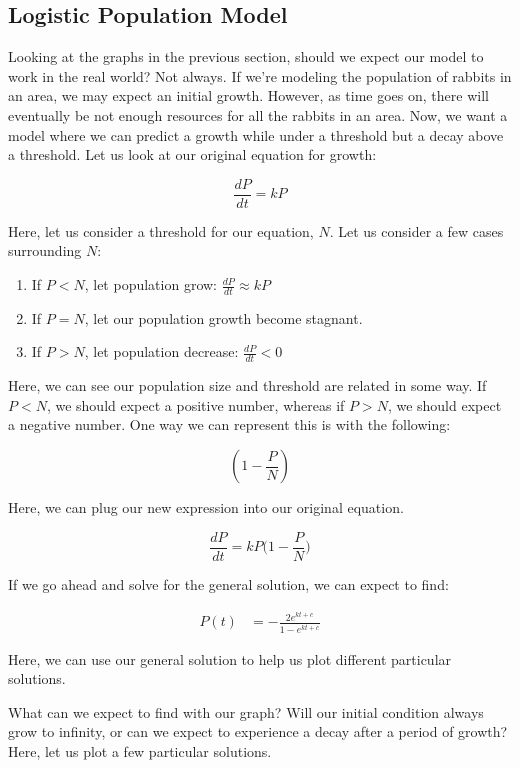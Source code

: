 \documentclass{amsart}
\theoremstyle{definition}
\numberwithin{equation}{section}
\begin{document}
\begin{sansmath}
\section{Logistic Population Model}

Looking at the graphs in the previous section, should we expect our model to work in the real world? Not always. If we're modeling the population of rabbits in an area, we may expect an initial growth. However, as time goes on, there will eventually be not enough resources for all the rabbits in an area. Now, we want a model where we can predict a growth while under a threshold but a decay above a threshold. Let us look at our original equation for growth:

\[ \frac{dP}{dt} = kP \]

Here, let us consider a threshold for our equation, $N$. Let us consider a few cases surrounding $N$:

\begin{enumerate}
  \item If $P < N$, let population grow: $\frac{dP}{dt} \approx kP$
  \item If $P = N$, let our population growth become stagnant.
  \item If $P > N$, let population decrease: $\frac{dP}{dt} < 0$
\end{enumerate}

Here, we can see our population size and threshold are related in some way. If $P < N$, we should expect a positive number, whereas if $P > N$, we should expect a negative number. One way we can represent this is with the following:

\[ (1 - \frac{P}{N} )\]

Here, we can plug our new expression into our original equation.

\[ \frac{dP}{dt} = kP \Big(1 - \frac{P}{N} \Big) \]

If we go ahead and solve for the general solution, we can expect to find:

\begin{align*}
  P(t) & = -\frac{2e^{kt + c}}{1 - e^{kt + c}}
\end{align*}

Here, we can use our general solution to help us plot different particular solutions.

What can we expect to find with our graph? Will our initial condition always grow to infinity, or can we expect to experience a decay after a period of growth? Here, let us plot a few particular solutions. %


\end{sansmath}
\end{document}
